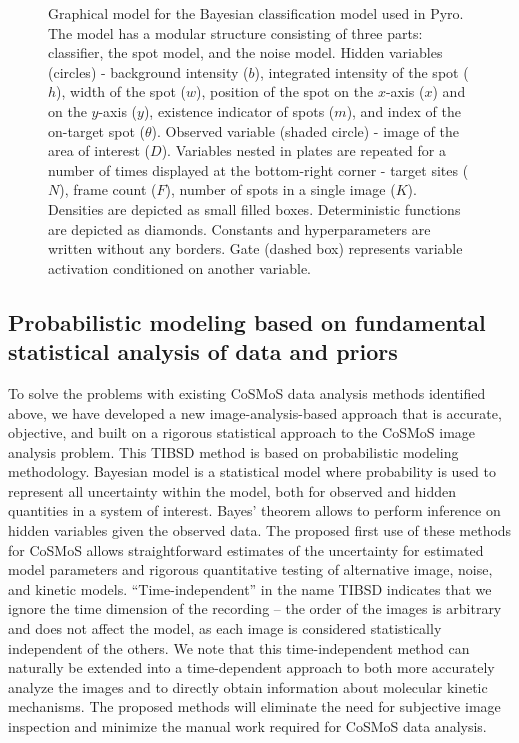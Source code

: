 \begin{figure}[ht]
  \begin{center}
    
  \end{center}
  \caption{Graphical model for the Bayesian classification model used in Pyro. The model has a modular structure consisting of three parts: classifier, the spot model, and the noise model. Hidden variables (circles) - background intensity ($b$), integrated intensity of the spot ($h$), width of the spot ($w$), position of the spot on the $x$-axis ($x$) and on the $y$-axis ($y$), existence indicator of spots ($m$), and index of the on-target spot ($\theta$). Observed variable (shaded circle) - image of the area of interest ($D$). Variables nested in plates are repeated for a number of times displayed at the bottom-right corner - target sites ($N$), frame count ($F$), number of spots in a single image ($K$). Densities are depicted as  small filled boxes. Deterministic functions are depicted as diamonds. Constants and hyperparameters are written without any borders. Gate (dashed box) represents variable activation conditioned on another variable.}
\end{figure}

\subsection{Probabilistic modeling based on fundamental statistical analysis of data and priors}

To solve the problems with existing CoSMoS data analysis methods identified above, we have developed a new image-analysis-based approach that is accurate, objective, and built on a rigorous statistical approach to the CoSMoS image analysis problem. This TIBSD method is based on probabilistic modeling methodology. Bayesian model is a statistical model where probability is used to represent all uncertainty within the model, both for observed and hidden quantities in a system of interest. Bayes' theorem allows to perform inference on hidden variables given the observed data. The proposed first use of these methods for CoSMoS allows straightforward estimates of the uncertainty for estimated model parameters and rigorous quantitative testing of alternative image, noise, and kinetic models. “Time-independent” in the name TIBSD indicates that we ignore the time dimension of the recording -- the order of the images is arbitrary and does not affect the model, as each image is considered statistically independent of the others. We note that this time-independent method can naturally be extended into a time-dependent approach to both more accurately analyze the images and to directly obtain information about molecular kinetic mechanisms.  The proposed methods will eliminate the need for subjective image inspection and minimize the manual work required for CoSMoS data analysis.

